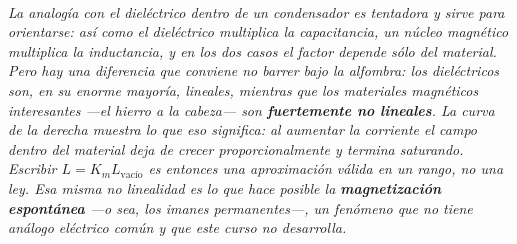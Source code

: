 \begin{center}
\begin{tikzpicture}[scale=1]
\end{tikzpicture}\\[0.5em]
{\small\itshape La analogía con el dieléctrico dentro de un condensador es
tentadora y sirve para orientarse: así como el dieléctrico multiplica la
capacitancia, un núcleo magnético multiplica la inductancia, y en los dos casos
el factor depende sólo del material. Pero hay una diferencia que conviene no
barrer bajo la alfombra: los dieléctricos son, en su enorme mayoría, lineales,
mientras que los materiales magnéticos interesantes ---el hierro a la
cabeza--- son \textbf{fuertemente no lineales}. La curva de la derecha muestra
lo que eso significa: al aumentar la corriente el campo dentro del material
deja de crecer proporcionalmente y termina saturando. Escribir $L = K_m
L_{\text{vacío}}$ es entonces una aproximación válida en un rango, no una ley.
Esa misma no linealidad es lo que hace posible la \textbf{magnetización
espontánea} ---o sea, los imanes permanentes---, un fenómeno que no tiene
análogo eléctrico común y que este curso no desarrolla.}
\end{center}
